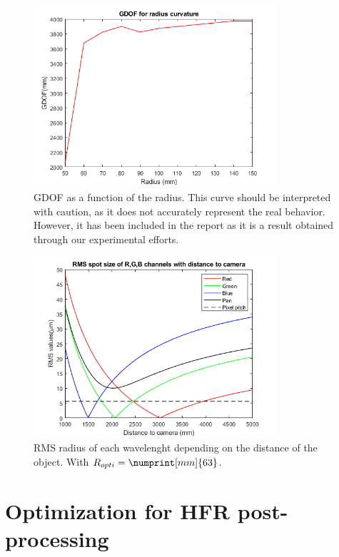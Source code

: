 \documentclass[10pt,letterpaper]{article}
\begin{document}
\begin{figure}[h]
    \centering
    \includegraphics[width=0.8\textwidth]{IO25_TP4_optim_R_QF_2000.png}
    \caption{GDOF as a function of the radius. This curve should be interpreted with caution, as it does not accurately represent the real behavior. However, it has been included in the report as it is a result obtained through our experimental efforts.}
    \label{fig:gdof_opti}
\end{figure}

\begin{figure}[h]
    \centering
    \includegraphics[width=0.8\textwidth]{matlab_gdof.png}
    \caption{RMS radius of each wavelenght depending on the distance of the object. With $R_{opti}=\numprint[mm]{63}$.}
    \label{fig:matlab_gdof}
\end{figure}

\section{Optimization for HFR post-processing}












\listoffigures
\end{document}
